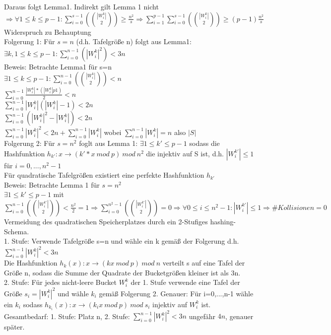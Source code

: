 \documentclass[a4paper]{article}
\begin{document}
Daraus folgt Lemma1. Indirekt gilt Lemma 1 nicht $\Rightarrow \forall 1\leq k\leq p-1: \sum_{i=0}^{s-1}({|W_i^k| \choose 2}) \geq \frac{n^2}{s}\Rightarrow \sum_{i=1}^{p-1}\sum_{i=0}^{s-1}({|W_i^k| \choose 2}) \geq (p-1)\frac{n^2}{s} $Widerspruch zu Behauptung\\
Folgerung 1: Für $s=n$ (d.h. Tafelgröße n) folgt aus Lemma1: $\exists k, 1\leq k\leq p-1: \sum_{i=0}^{n-1}(|W_i^k|^2)<3n$\\
Beweis: Betrachte Lemma1 für s=n\\
$\exists 1\leq k\leq p-1 :\sum_{i=0}^{n-1}({|W_i^k| \choose 2}) < n$\\
$\sum_{i=0}^{n-1}\frac{|W_i^k|*(|W_i^k|p1)}{2} < n$\\
$\sum_{i=0}^{n-1}|W_i^k|(|W_i^k|-1) <2n$\\
$\sum_{i=0}^{n-1}(|W_i^k|^2-|W_i^k|) <2n$\\
$\sum_{i=0}^{n-1}|W_i^k|^2 < 2n+\sum_{i=0}^{n-1} |W_i^k|$ wobei $\sum_{i=0}^{n-1} |W_i^k| = n$ also $|S|$\\
Folgerung 2: Für $s=n^2$ foglt aus Lemma 1: $\exists 1\leq k' \leq p-1$ sodass die Hashfunktion $h_{k'}:x\rightarrow (k'*x\ mod\ p)\ mod\ n^2$ die injektiv auf S ist, d.h. $|W_i^{k'}|\leq 1$ für $i=0,...,n^2-1$\\
Für quadratische Tafelgrößen existiert eine perfekte Hashfunktion $h_{k'}$\\
Beweis: Betrachte Lemma 1 für $s=n^2$\\
$\exists 1\leq k'\leq p-1$ mit $\sum_{i=0}^{n-1}({|W_i^{k'}| \choose 2}) < \frac{n^2}{2}=1\Rightarrow \sum_{i=0}^{n^2-1}({|W_i^{k'}| \choose 2}) = 0 \Rightarrow \forall 0\leq i \leq n^2-1: |W_i^{k'}|\leq 1 \Rightarrow \#Kollisionen=0$\\
Vermeidung des quadratischen Speicherplatzes durch ein 2-Stufiges hashing-Schema.\\
1. Stufe: Verwende Tafelgröße s=n und wähle ein k gemäß der Folgerung d.h. $\sum_{i=0}^{n-1}|W_i^k|^2<3n$\\
Die Hashfunktion $h_k(x):x\rightarrow (kx\ mod\ p)\ mod\ n$ verteilt s auf eine Tafel der Größe n, sodass die Summe der Quadrate der Bucketgrößen kleiner ist als 3n.\\
2. Stufe: Für jedes nicht-leere Bucket $W_i^k$ der 1. Stufe verwende eine Tafel der Größe $s_i=|W_i^k|^2$ und wähle $k_i$ gemäß Folgerung 2. Genauer: Für i=0,...,n-1 wähle ein $k_i$ sodass $h_{k_i}(x): x\rightarrow (k_ix\ mod\ p)\ mod\ s_i$ injektiv auf $W_i^k$ ist.\\
Gesamtbedarf: 1. Stufe: Platz n, 2. Stufe: $\sum_{i=0}^{n-1}|W_i^k|^2 < 3n$ ungefähr $4n$, genauer später.\\
\end{document}
